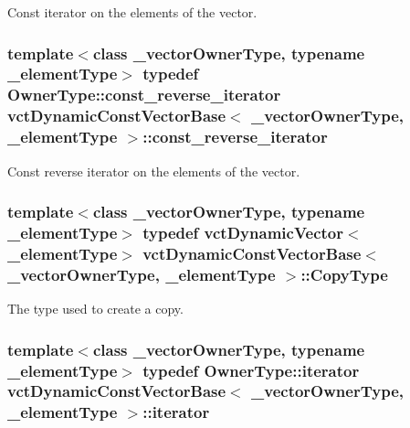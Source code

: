 Const iterator on the elements of the vector. \hypertarget{classvct_dynamic_const_vector_base_aadfcc99550b376238b6c793c17d19ca5}{
\subsubsection[{const\-\_\-reverse\-\_\-iterator}]{\setlength{\rightskip}{0pt plus 5cm}template$<$class \-\_\-vector\-Owner\-Type, typename \-\_\-element\-Type$>$ typedef Owner\-Type\-::const\-\_\-reverse\-\_\-iterator {\bf vct\-Dynamic\-Const\-Vector\-Base}$<$ \-\_\-vector\-Owner\-Type, \-\_\-element\-Type $>$\-::{\bf const\-\_\-reverse\-\_\-iterator}}}\label{classvct_dynamic_const_vector_base_aadfcc99550b376238b6c793c17d19ca5}
Const reverse iterator on the elements of the vector. \hypertarget{classvct_dynamic_const_vector_base_a010ba1a93ccebf494be5a188f923eb43}{
\subsubsection[{Copy\-Type}]{\setlength{\rightskip}{0pt plus 5cm}template$<$class \-\_\-vector\-Owner\-Type, typename \-\_\-element\-Type$>$ typedef {\bf vct\-Dynamic\-Vector}$<$\-\_\-element\-Type$>$ {\bf vct\-Dynamic\-Const\-Vector\-Base}$<$ \-\_\-vector\-Owner\-Type, \-\_\-element\-Type $>$\-::{\bf Copy\-Type}}}\label{classvct_dynamic_const_vector_base_a010ba1a93ccebf494be5a188f923eb43}
The type used to create a copy. \hypertarget{classvct_dynamic_const_vector_base_aaed13bc31a9ee4971bad765ba5c2c811}{
\subsubsection[{iterator}]{\setlength{\rightskip}{0pt plus 5cm}template$<$class \-\_\-vector\-Owner\-Type, typename \-\_\-element\-Type$>$ typedef Owner\-Type\-::iterator {\bf vct\-Dynamic\-Const\-Vector\-Base}$<$ \-\_\-vector\-Owner\-Type, \-\_\-element\-Type $>$\-::{\bf iterator}}}\label{classvct_dynamic_const_vector_base_aaed13bc31a9ee4971bad765ba5c2c811}
